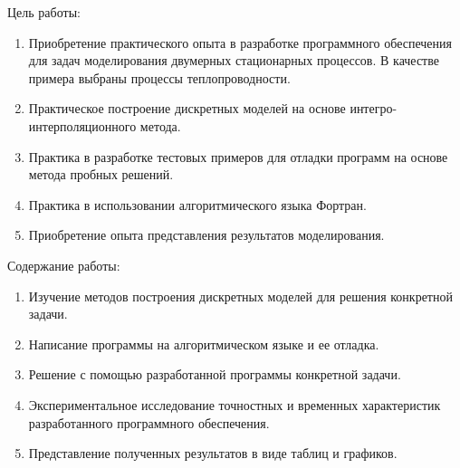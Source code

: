 \noindent Цель работы:
\begin{enumerate}
  \item Приобретение практического опыта в разработке программного обеспечения для задач моделирования двумерных
  стационарных процессов. В качестве примера выбраны процессы теплопроводности.
  \item Практическое построение дискретных моделей на основе интегро-интерполяционного метода.
  \item Практика в разработке тестовых примеров для отладки программ на основе метода пробных решений.
  \item Практика в использовании алгоритмического языка Фортран.
  \item Приобретение опыта представления результатов моделирования.
\end{enumerate}

\noindent Содержание работы:
\begin{enumerate}
  \item Изучение методов построения дискретных моделей для решения конкретной задачи.
  \item Написание программы на алгоритмическом языке и ее отладка.
  \item Решение с помощью разработанной программы конкретной задачи.
  \item Экспериментальное исследование точностных и временных характеристик разработанного программного обеспечения.
  \item Представление полученных результатов в виде таблиц и графиков.
\end{enumerate}
